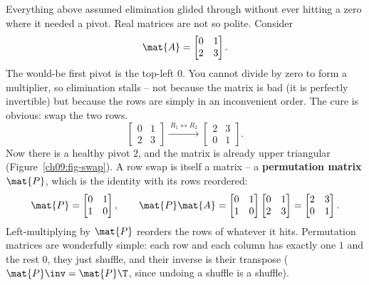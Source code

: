 Everything above assumed elimination glided through without ever hitting a zero where it
needed a pivot. Real matrices are not so polite. Consider
\[
  \mat{A} = \begin{bmatrix} 0 & 1 \\ 2 & 3 \end{bmatrix}.
\]
The would-be first pivot is the top-left $0$. You cannot divide by zero to form a
multiplier, so elimination stalls -- not because the matrix is bad (it is perfectly
invertible) but because the rows are simply in an inconvenient order. The cure is obvious:
swap the two rows.
\[
  \begin{bmatrix} 0 & 1 \\ 2 & 3 \end{bmatrix}
  \xrightarrow{\ R_1 \leftrightarrow R_2\ }
  \begin{bmatrix} 2 & 3 \\ 0 & 1 \end{bmatrix}.
\]
Now there is a healthy pivot $2$, and the matrix is already upper triangular
(Figure~\ref{ch09:fig-swap}). A row swap is
itself a matrix -- a \textbf{permutation matrix} $\mat{P}$, which is the identity with its
rows reordered:
\[
  \mat{P} = \begin{bmatrix} 0 & 1 \\ 1 & 0 \end{bmatrix},
  \qquad
  \mat{P}\mat{A} = \begin{bmatrix} 0&1\\1&0 \end{bmatrix}\begin{bmatrix} 0&1\\2&3 \end{bmatrix}
  = \begin{bmatrix} 2 & 3 \\ 0 & 1 \end{bmatrix}.
\]
Left-multiplying by $\mat{P}$ reorders the rows of whatever it hits. Permutation matrices
are wonderfully simple: each row and each column has exactly one $1$ and the rest $0$, they
just shuffle, and their inverse is their transpose ($\mat{P}\inv = \mat{P}\T$, since undoing
a shuffle is a shuffle).


